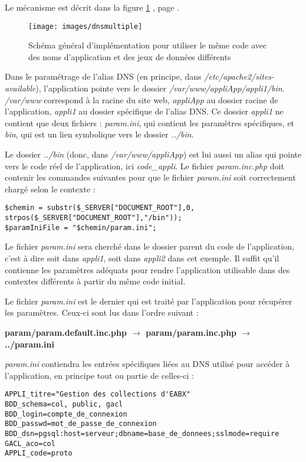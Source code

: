 Le mécanisme est décrit dans la figure \ref{dnsmultipleschema} \textit{}, page \pageref{dnsmultipleschema}.

\begin{figure}[H]
\texttt{[image: images/dnsmultiple]}
\caption{\label{dnsmultipleschema}Schéma général d’implémentation pour utiliser le même code avec des noms d’application et des jeux de données différents}
\end{figure}

Dans le paramétrage de l’alias DNS (en principe, dans \textit{/etc/apache2/sites-available}), l’application pointe vers le dossier \textit{/var/www/appliApp/appli1/bin}. \textit{/var/www} correspond à la racine du site web, \textit{appliApp} au dossier racine de l’application, \textit{appli1} au dossier spécifique de l’alias DNS. Ce dossier \textit{appli1} ne contient que deux fichiers : \textit{param.ini}, qui contient les paramètres spécifiques, et \textit{bin}, qui est un lien symbolique vers le dossier \textit{../bin}.

Le dossier \textit{../bin} (donc, dans\textit{ /var/www/appliApp}) est lui aussi un alias qui pointe vers le code réel de l’application, ici \textit{code\_appli}. Le fichier \textit{param.inc.php} doit contenir les commandes suivantes pour que le fichier \textit{param.ini} soit correctement chargé selon le contexte :
\begin{lstlisting}
$chemin = substr($_SERVER["DOCUMENT_ROOT"],0, strpos($_SERVER["DOCUMENT_ROOT"],"/bin"));
$paramIniFile = "$chemin/param.ini";
\end{lstlisting}

Le fichier \textit{param.ini} sera cherché dans le dossier parent du code de l’application, c’est à dire soit dans \textit{appli1}, soit dans \textit{appli2} dans cet exemple. Il suffit qu’il contienne les paramètres adéquats pour rendre l’application utilisable dans des contextes différents à partir du même code initial.

Le fichier \textit{param.ini} est le dernier qui est traité par l'application pour récupérer les paramètres. Ceux-ci sont lus dans l'ordre suivant :

\textbf{param/param.default.inc.php $\rightarrow$ param/param.inc.php $\rightarrow$ ../param.ini}

\textit{param.ini} contiendra les entrées spécifiques liées au DNS utilisé pour accéder à l'application, en principe tout ou partie de celles-ci :
\begin{lstlisting}
APPLI_titre="Gestion des collections d'EABX"
BDD_schema=col, public, gacl
BDD_login=compte_de_connexion
BDD_passwd=mot_de_passe_de_connexion
BDD_dsn=pgsql:host=serveur;dbname=base_de_donnees;sslmode=require
GACL_aco=col
APPLI_code=proto
\end{lstlisting}

